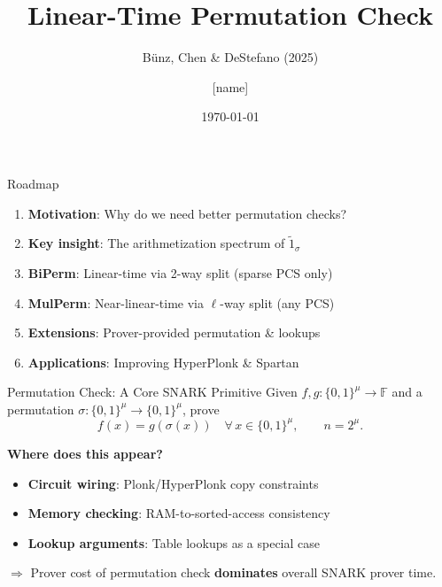 \documentclass[aspectratio=169,10pt]{beamer}
\title[Linear-Time Permutation Check]{Linear-Time Permutation Check}
\subtitle{B\"unz, Chen \& DeStefano (2025)}
\author{[name]}
\institute{Shanghai Jiao Tong University}
\date{\today}
\newcommand{\F}{\mathbb{F}}
\newcommand{\B}{\{0,1\}}
\newcommand{\wt}[1]{\widetilde{#1}}
\begin{document}
\begin{frame}
  \titlepage
\end{frame}

\begin{frame}{Roadmap}
\begin{enumerate}
  \item \textbf{Motivation}: Why do we need better permutation checks?
  \item \textbf{Key insight}: The arithmetization spectrum of $\wt{1}_\sigma$
  \item \textbf{BiPerm}: Linear-time via 2-way split (sparse PCS only)
  \item \textbf{MulPerm}: Near-linear-time via $\ell$-way split (any PCS)
  \item \textbf{Extensions}: Prover-provided permutation \& lookups
  \item \textbf{Applications}: Improving HyperPlonk \& Spartan
\end{enumerate}
\end{frame}


\begin{frame}{Permutation Check: A Core SNARK Primitive}
Given $f, g : \B^\mu \to \F$ and a permutation $\sigma : \B^\mu \to \B^\mu$, prove
\[
  f(x) = g(\sigma(x)) \quad \forall\, x \in \B^\mu, \qquad n = 2^\mu.
\]

\vspace{0.8em}
\textbf{Where does this appear?}
\begin{itemize}
  \item \textbf{Circuit wiring}: Plonk/HyperPlonk copy constraints
  \item \textbf{Memory checking}: RAM-to-sorted-access consistency
  \item \textbf{Lookup arguments}: Table lookups as a special case
\end{itemize}

\vspace{0.8em}
$\Rightarrow$ Prover cost of permutation check \textbf{dominates} overall SNARK prover time.
\end{frame}
\end{document}
